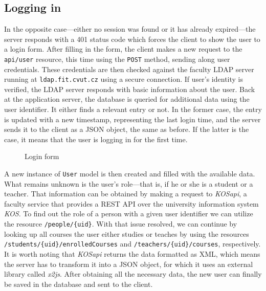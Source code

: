 \documentclass[thesis=M,english,hidelinks]{FITthesis}[2012/10/20]
\newcommand{\code}{\texttt}
\begin{document}
    \subsection{Logging in}

In the opposite case---either no session was found or it has already expired---the server responds with a 401 status code which forces the client to show the user to a login form. After filling in the form, the client makes a new request to the \code{api/user} resource, this time using the \code{POST} method, sending along user credentials. These credentials are then checked against the faculty LDAP server running at \code{ldap.fit.cvut.cz} using a secure connection. If user's identity is verified, the LDAP server responds with basic information about the user. Back at the application server, the database is queried for additional data using the user identifier. It either finds a relevant entry or not. In the former case, the entry is updated with a new timestamp, representing the last login time, and the server sends it to the client as a JSON object, the same as before. If the latter is the case, it means that the user is logging in for the first time.

\begin{figure}
  \setlength\fboxsep{0pt}
  \setlength\fboxrule{0.2pt}
  \caption{Login form}
  \label{fig:login_form}
\end{figure}

A new instance of \code{User} model is then created and filled with the available data. What remains unknown is the user's role---that is, if he or she is a student or a teacher. That information can be obtained by making a request to \textit{KOSapi}, a faculty service that provides a REST API over the university information system \textit{KOS}. To find out the role of a person with a given user identifier we can utilize the resource \code{/people/\{uid\}}. With that issue resolved, we can continue by looking up all courses the user either studies or teaches by using the resources \code{/students/\{uid\}/enrolledCourses} and \code{/teachers/\{uid\}/courses}, respectively. It is worth noting that \textit{KOSapi} returns the data formatted as XML, which means the server has to transform it into a JSON object, for which it uses an external library called \textit{x2js}. After obtaining all the necessary data, the new user can finally be saved in the database and sent to the client.
\end{document}
